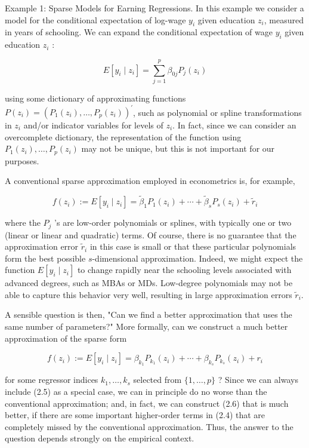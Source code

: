 \documentclass[10pt]{article}
\begin{document}
Example 1: Sparse Models for Earning Regressions. In this example we consider a model for the conditional expectation of log-wage \(y_{i}\) given education \(z_{i}\), measured in years of schooling. We can expand the conditional expectation of wage \(y_{i}\) given education \(z_{i}\) :

\[
E\left[y_{i} \mid z_{i}\right]=\sum_{j=1}^{p} \beta_{0 j} P_{j}\left(z_{i}\right)
\]

using some dictionary of approximating functions \(P\left(z_{i}\right)=\left(P_{1}\left(z_{i}\right), \ldots, P_{p}\left(z_{i}\right)\right)^{\prime}\), such as polynomial or spline transformations in \(z_{i}\) and/or indicator variables for levels of \(z_{i}\). In fact, since we can consider an overcomplete dictionary, the representation of the function using \(P_{1}\left(z_{i}\right), \ldots, P_{p}\left(z_{i}\right)\) may not be unique, but this is not important for our purposes.

A conventional sparse approximation employed in econometrics is, for example,

\[
f\left(z_{i}\right):=E\left[y_{i} \mid z_{i}\right]=\tilde{\beta}_{1} P_{1}\left(z_{i}\right)+\cdots+\tilde{\beta}_{s} P_{s}\left(z_{i}\right)+\tilde{r}_{i}
\]

where the \(P_{j}\) 's are low-order polynomials or splines, with typically one or two (linear or linear and quadratic) terms. Of course, there is no guarantee that the approximation error \(\tilde{r}_{i}\) in this case is small or that these particular polynomials form the best possible \(s\)-dimensional approximation. Indeed, we might expect the function \(E\left[y_{i} \mid z_{i}\right]\) to change rapidly near the schooling levels associated with advanced degrees, such as MBAs or MDs. Low-degree polynomials may not be able to capture this behavior very well, resulting in large approximation errors \(\tilde{r}_{i}\).

A sensible question is then, "Can we find a better approximation that uses the same number of parameters?" More formally, can we construct a much better approximation of the sparse form

\[
f\left(z_{i}\right):=E\left[y_{i} \mid z_{i}\right]=\beta_{k_{1}} P_{k_{1}}\left(z_{i}\right)+\cdots+\beta_{k_{s}} P_{k_{s}}\left(z_{i}\right)+r_{i}
\]

for some regressor indices \(k_{1}, \ldots, k_{s}\) selected from \(\{1, \ldots, p\}\) ? Since we can always include (2.5) as a special case, we can in principle do no worse than the conventional approximation; and, in fact, we can construct (2.6) that is much better, if there are some important higher-order terms in (2.4) that are completely missed by the conventional approximation. Thus, the answer to the question depends strongly on the empirical context.
\end{document}
